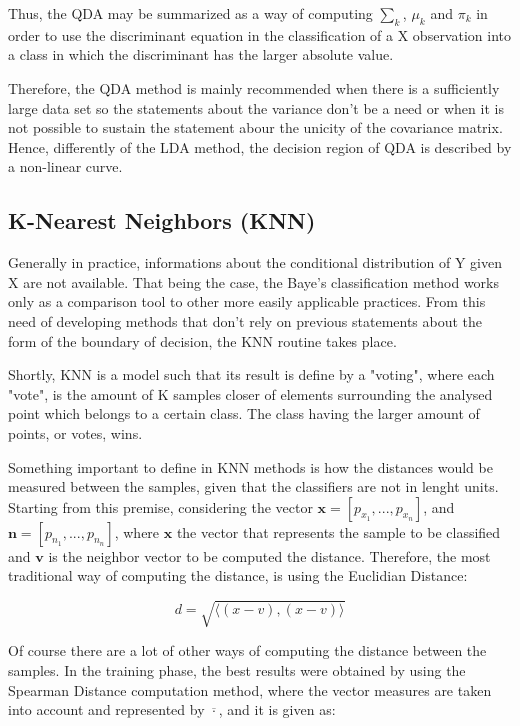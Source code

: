 \documentclass[conference]{IEEEtran}
\begin{document}
Thus, the QDA may be summarized as a way of computing $\sum_k$, $\mu_k$ and $\pi_k$ 
in order to use the discriminant equation in the classification of a X observation into a class
in which the discriminant has the larger absolute value.  

Therefore, the QDA method is mainly recommended when there is a sufficiently large data set
so the statements about the variance don't be a need or when it is not possible to 
sustain the statement abour the unicity of the covariance matrix. Hence, differently 
of the LDA method, the decision region of QDA is described by a non-linear curve. 

\subsection{K-Nearest Neighbors (KNN)}

Generally in practice, informations about the conditional distribution of Y given X 
are not available. That being the case, the Baye's classification method works only as 
a comparison tool to other more easily applicable practices. From this need of developing 
methods that don't rely on previous statements about the form of the boundary of decision,
the KNN routine takes place.

Shortly, KNN is a model such that its result is define by a "voting", where each "vote", 
is the amount of K samples closer of elements surrounding the analysed point which belongs
to a certain class. The class having the larger amount of points, or votes, wins. 

Something important to define in KNN methods is how the distances would be measured between
the samples, given that the classifiers are not in lenght units. Starting from this premise,
considering the vector $\textbf{x} = [p_{x_1}, ..., p_{x_n}]$, and $\textbf{n} = [p_{n_1}, ..., p_{n_n}]$, 
where $\textbf{x}$ the vector that represents the sample to be classified and $\textbf{v}$
is the neighbor vector to be computed the distance. Therefore, the most traditional way 
of computing the distance, is using the Euclidian Distance:

\begin{equation}
    d = \sqrt{\langle (x-v), (x-v)\rangle} \label{eq16}
\end{equation}

Of course there are a lot of other ways of computing the distance between the samples. 
In the training phase, the best results were obtained by using the Spearman Distance computation
method, where the vector measures are taken into account and represented by $\overline{\cdot}$, and it is 
given as: 
\end{document}
